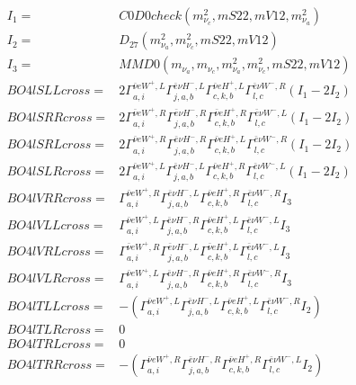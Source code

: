 \documentclass[A4,landscape]{article}
\begin{document}
\begin{align} 
I_1 = & C0D0check(m^2_{\nu_{{c}}}, mS22, mV12, m^2_{\nu_{{a}}}) \\ 
I_2 = & D_{27}(m^2_{\nu_{{a}}}, m^2_{\nu_{{c}}}, mS22, mV12) \\ 
I_3 = & MMD0(m_{\nu_{{a}}}, m_{\nu_{{c}}}, m^2_{\nu_{{a}}}, m^2_{\nu_{{c}}}, mS22, mV12) \\ 
  BO4lSLLcross= & 2  \Gamma^{\bar{\nu}e W^+,L}_{a, i} \Gamma^{\bar{e}\nu H^- ,L}_{j, a, b} \Gamma^{\bar{\nu}e H^+,L}_{c, k, b} \Gamma^{\bar{e}\nu W^- ,R}_{l, c} (I_1 - 2 I_2) \\ 
  BO4lSRRcross= & 2  \Gamma^{\bar{\nu}e W^+,R}_{a, i} \Gamma^{\bar{e}\nu H^- ,R}_{j, a, b} \Gamma^{\bar{\nu}e H^+,R}_{c, k, b} \Gamma^{\bar{e}\nu W^- ,L}_{l, c} (I_1 - 2 I_2) \\ 
  BO4lSRLcross= & 2  \Gamma^{\bar{\nu}e W^+,R}_{a, i} \Gamma^{\bar{e}\nu H^- ,R}_{j, a, b} \Gamma^{\bar{\nu}e H^+,L}_{c, k, b} \Gamma^{\bar{e}\nu W^- ,R}_{l, c} (I_1 - 2 I_2) \\ 
  BO4lSLRcross= & 2  \Gamma^{\bar{\nu}e W^+,L}_{a, i} \Gamma^{\bar{e}\nu H^- ,L}_{j, a, b} \Gamma^{\bar{\nu}e H^+,R}_{c, k, b} \Gamma^{\bar{e}\nu W^- ,L}_{l, c} (I_1 - 2 I_2) \\ 
  BO4lVRRcross= &  \Gamma^{\bar{\nu}e W^+,R}_{a, i} \Gamma^{\bar{e}\nu H^- ,L}_{j, a, b} \Gamma^{\bar{\nu}e H^+,R}_{c, k, b} \Gamma^{\bar{e}\nu W^- ,R}_{l, c} I_3 \\ 
  BO4lVLLcross= &  \Gamma^{\bar{\nu}e W^+,L}_{a, i} \Gamma^{\bar{e}\nu H^- ,R}_{j, a, b} \Gamma^{\bar{\nu}e H^+,L}_{c, k, b} \Gamma^{\bar{e}\nu W^- ,L}_{l, c} I_3 \\ 
  BO4lVRLcross= &  \Gamma^{\bar{\nu}e W^+,R}_{a, i} \Gamma^{\bar{e}\nu H^- ,L}_{j, a, b} \Gamma^{\bar{\nu}e H^+,L}_{c, k, b} \Gamma^{\bar{e}\nu W^- ,L}_{l, c} I_3 \\ 
  BO4lVLRcross= &  \Gamma^{\bar{\nu}e W^+,L}_{a, i} \Gamma^{\bar{e}\nu H^- ,R}_{j, a, b} \Gamma^{\bar{\nu}e H^+,R}_{c, k, b} \Gamma^{\bar{e}\nu W^- ,R}_{l, c} I_3 \\ 
  BO4lTLLcross= & -( \Gamma^{\bar{\nu}e W^+,L}_{a, i} \Gamma^{\bar{e}\nu H^- ,L}_{j, a, b} \Gamma^{\bar{\nu}e H^+,L}_{c, k, b} \Gamma^{\bar{e}\nu W^- ,R}_{l, c} I_2) \\ 
  BO4lTLRcross= & 0 \\ 
  BO4lTRLcross= & 0 \\ 
  BO4lTRRcross= & -( \Gamma^{\bar{\nu}e W^+,R}_{a, i} \Gamma^{\bar{e}\nu H^- ,R}_{j, a, b} \Gamma^{\bar{\nu}e H^+,R}_{c, k, b} \Gamma^{\bar{e}\nu W^- ,L}_{l, c} I_2) \\ 
\end{align} 
\end{document}
